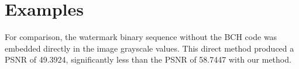 \section{Examples}\label{sec:examples}
\stub{[Before and after images of watermark embedding}
For comparison, the watermark binary sequence without the BCH code was embedded directly in the image grayscale values.
This direct method produced a PSNR of 49.3924, significantly less than the PSNR of 58.7447 with our method.
